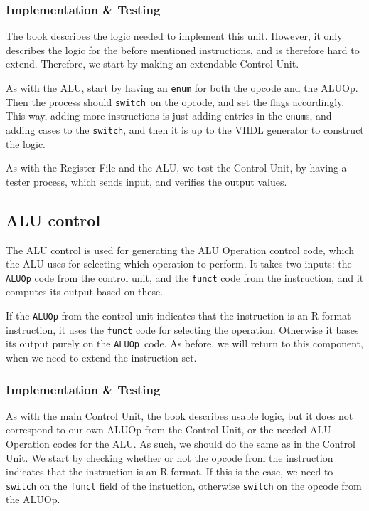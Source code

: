 \subsubsection*{Implementation \& Testing}
The book describes the logic needed to implement this unit. However, it only
describes the logic for the before mentioned instructions, and is therefore
hard to extend. Therefore, we start by making an extendable Control Unit.

As with the ALU, start by having an \texttt{enum} for both the opcode and the
ALUOp. Then the process should \texttt{switch} on the opcode, and set the flags
accordingly. This way, adding more instructions is just adding entries in the
\texttt{enum}s, and adding cases to the \texttt{switch}, and then it is up to
the VHDL generator to construct the logic.

As with the Register File and the ALU, we test the Control Unit, by having a
tester process, which sends input, and verifies the output values.

\subsection{ALU control}\label{sec:alu-control}
The ALU control is used for generating the ALU Operation control code, which
the ALU uses for selecting which operation to perform. It takes two inputs: the
\texttt{ALUOp} code from the control unit, and the \texttt{funct} code from the
instruction, and it computes its output based on these.

If the \texttt{ALUOp} from the control unit indicates that the instruction is
an R format instruction, it uses the \texttt{funct} code for selecting the
operation.  Otherwise it bases its output purely on the \texttt{ALUOp} code. As
before, we will return to this component, when we need to extend the
instruction set.

\subsubsection*{Implementation \& Testing}
As with the main Control Unit, the book describes usable logic, but it does not
correspond to our own ALUOp from the Control Unit, or the needed ALU Operation
codes for the ALU. As such, we should do the same as in the Control Unit. We
start by checking whether or not the opcode from the instruction indicates that
the instruction is an R-format. If this is the case, we need to \texttt{switch}
on the \texttt{funct} field of the instuction, otherwise \texttt{switch} on the
opcode from the ALUOp.

